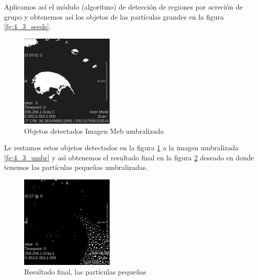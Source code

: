 \documentclass{article}
\begin{document}
\begin{par}
Aplicamos as\'{i} el m\'{o}dulo (algoritmo) de detecci\'{o}n de regiones por acreci\'{o}n de grupo y obtenemos as\'{i} los objetos de las part\'{i}culas grandes en la figura \ref{fg:4_3_seeds}.
\end{par}

\begin{figure}[ht]
\begin{center}
\includegraphics[width=0.4\textwidth]{4Sintesis/4_3_objects} %
\caption{Objetos detectados Imagen Meb umbralizada}
\label{fg:4_3_objects}
\end{center}
\end{figure}
\FloatBarrier

\begin{par}
Le restamos estos objetos detectados en la figura \ref{fg:4_3_objects} a la imagen
umbralizada \ref{fg:4_3_umbr} y as\'{i} obtenemos el resultado final en la figura
\ref{fg:4_3_final} deseado en donde tenemos las part\'{i}culas peque\~{u}as umbralizadas.
\end{par}

\begin{figure}[ht]
\begin{center}
\includegraphics[width=0.4\textwidth]{4Sintesis/4_3_final} %
\caption{Resultado final, las part\'{i}culas peque\~{u}as}
\label{fg:4_3_final}
\end{center}
\end{figure}
\FloatBarrier

\nocite{*}
\FloatBarrier





\end{document}
